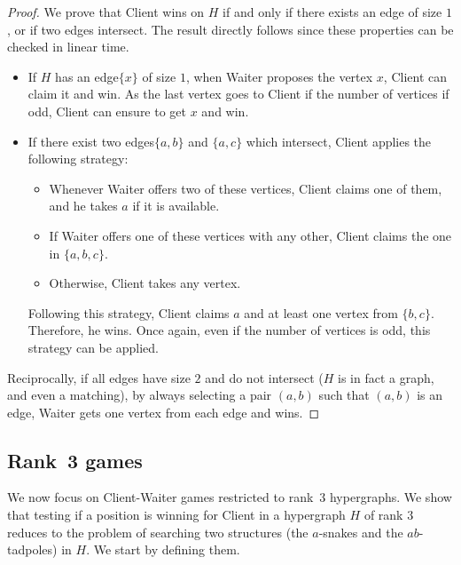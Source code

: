 \documentclass{article}
\newcommand{\hyp}{H}
\newcommand{\hedge}{edge\xspace}
\newcommand{\hedges}{edges\xspace}
\begin{document}
\begin{proof}
    We prove that Client wins on $\hyp$ if and only if there exists an \hedge of size $1$, or if two \hedges intersect. The result directly follows since these properties can be checked in linear time.

    \begin{itemize}
        \item  If $\hyp$ has an \hedge $\{x\}$ of size $1$, when Waiter proposes the vertex $x$, Client can claim it and win. As the last vertex goes to Client if the number of vertices if odd, Client can ensure to get \(x\) and win.
        \item If there exist two \hedges $\{a,b\}$ and $\{a,c\}$ which intersect, Client applies the following strategy: \begin{itemize}[noitemsep]
            \item Whenever Waiter offers two of these vertices, Client claims one of them, and he takes $a$ if it is available.
            \item If Waiter offers one of these vertices with any other, Client claims the one in $\{a,b,c\}$. 
            \item Otherwise, Client takes any vertex.
        \end{itemize}
        Following this strategy, Client claims \(a\) and at least one vertex from $\{b,c\}$. Therefore, he wins. Once again, even if the number of vertices is odd, this strategy can be applied.
    \end{itemize}

    Reciprocally, if all \hedges have size $2$ and do not intersect (\(H\) is in fact a graph, and even a matching), by always selecting a pair $(a,b)$ such that $(a,b)$ is an \hedge, Waiter gets one vertex from each \hedge and wins.
\end{proof}


\subsection{Rank~3 games}

We now focus on Client-Waiter games restricted to rank~$3$ hypergraphs. We show that testing if a position is winning for Client in a hypergraph \(\hyp\) of rank \(3\) reduces to the problem of searching two structures (the \(a\)-snakes and the \(ab\)-tadpoles) in \(\hyp\). We start by defining them.
\end{document}
